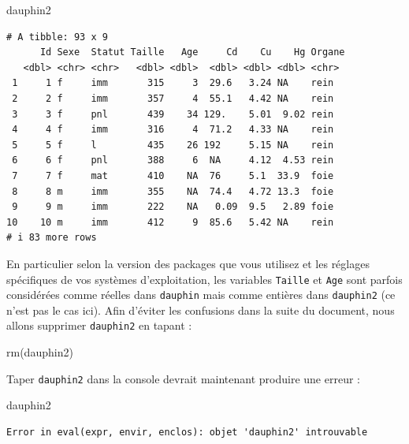 \documentclass[
  a4paper,
  DIV=11,
  numbers=noendperiod,
  oneside]{scrreprt}
\newenvironment{Shaded}{}{}
\newcommand{\FunctionTok}[1]{\textcolor[rgb]{0.44,0.26,0.76}{#1}}
\newcommand{\NormalTok}[1]{\textcolor[rgb]{0.14,0.16,0.18}{#1}}
\begin{document}
\begin{Shaded}
\begin{Highlighting}[]
\NormalTok{dauphin2}
\end{Highlighting}
\end{Shaded}

\begin{verbatim}
# A tibble: 93 x 9
      Id Sexe  Statut Taille   Age     Cd    Cu    Hg Organe
   <dbl> <chr> <chr>   <dbl> <dbl>  <dbl> <dbl> <dbl> <chr> 
 1     1 f     imm       315     3  29.6   3.24 NA    rein  
 2     2 f     imm       357     4  55.1   4.42 NA    rein  
 3     3 f     pnl       439    34 129.    5.01  9.02 rein  
 4     4 f     imm       316     4  71.2   4.33 NA    rein  
 5     5 f     l         435    26 192     5.15 NA    rein  
 6     6 f     pnl       388     6  NA     4.12  4.53 rein  
 7     7 f     mat       410    NA  76     5.1  33.9  foie  
 8     8 m     imm       355    NA  74.4   4.72 13.3  foie  
 9     9 m     imm       222    NA   0.09  9.5   2.89 foie  
10    10 m     imm       412     9  85.6   5.42 NA    rein  
# i 83 more rows
\end{verbatim}

En particulier selon la version des packages que vous utilisez et les
réglages spécifiques de vos systèmes d'exploitation, les variables
\texttt{Taille} et \texttt{Age} sont parfois considérées comme réelles
dans \texttt{dauphin} mais comme entières dans \texttt{dauphin2} (ce
n'est pas le cas ici). Afin d'éviter les confusions dans la suite du
document, nous allons supprimer \texttt{dauphin2} en tapant :

\begin{Shaded}
\begin{Highlighting}[]
\FunctionTok{rm}\NormalTok{(dauphin2)}
\end{Highlighting}
\end{Shaded}

Taper \texttt{dauphin2} dans la console devrait maintenant produire une
erreur :

\begin{Shaded}
\begin{Highlighting}[]
\NormalTok{dauphin2}
\end{Highlighting}
\end{Shaded}

\begin{verbatim}
Error in eval(expr, envir, enclos): objet 'dauphin2' introuvable
\end{verbatim}
\end{document}
